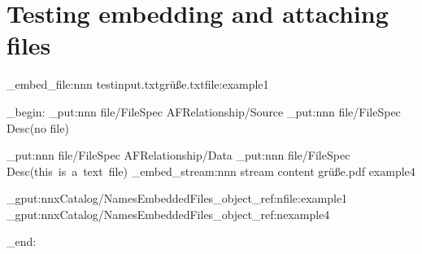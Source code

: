 \documentclass{article}
\begin{document}
\section{Testing embedding and attaching files}
\ExplSyntaxOn
\pdffile_embed_file:nnn {testinput.txt}{grüße.txt}{file:example1}



\group_begin:
\pdfdict_put:nnn  {file/FileSpec} {AFRelationship}{/Source}
\pdfdict_put:nnn  {file/FileSpec} {Desc}{(no file)}

\pdfdict_put:nnn  {file/FileSpec} {AFRelationship}{/Data}
\pdfdict_put:nnn  {file/FileSpec} {Desc}{(this~is~a~text~file)}
\pdffile_embed_stream:nnn {stream content} {grüße.pdf} {example4}



\pdfcoredict_gput:nnx{Catalog/Names}{EmbeddedFiles}{\pdf_object_ref:n{file:example1}}
\pdfcoredict_gput:nnx{Catalog/Names}{EmbeddedFiles}{\pdf_object_ref:n{example4}}

\group_end:
\end{document}
